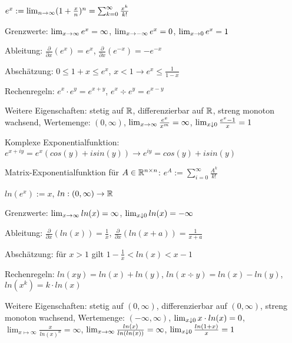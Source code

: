 \begin{definition}[Exponentialfunktion]
	$e^x := \lim_{n \rightarrow \infty} (1 + \frac{x}{n})^n = \sum_{k=0}^{\infty} \frac{x^k}{k!}$
	\begin{description} [noitemsep]
		\item Grenzwerte: $\lim_{x \rightarrow \infty} e^x = \infty$, $\lim_{x \rightarrow -\infty} e^x = 0$, $\lim_{x \rightarrow 0} e^x = 1$
		\item Ableitung: $\frac{\partial}{\partial x}(e^x) = e^x$, $\frac{\partial}{\partial x}(e^{-x}) = -e^{-x}$		
		\item Abschätzung: $ 0 \leq 1 + x \leq e^x$,  $x < 1 \rightarrow e^x \leq \frac{1}{1 - x}$ 
		\item Rechenregeln: $e^x \cdot e^y = e^{x+y}$, $e^x \div e^y = e^{x-y}$
		\item Weitere Eigenschaften: stetig auf $\mathbb{R}$, differenzierbar auf $\mathbb{R}$, streng monoton wachsend, Wertemenge: $(0, \infty)$, $\lim_{x \rightarrow \infty} \frac{e^x}{x^m} = \infty$, $\lim_{x \downarrow 0} \frac{e^x - 1}{x} = 1$
		\item Komplexe Exponentialfunktion: $e^{x+iy} = e^x(cos(y) + i sin(y)) \rightarrow e^{iy} = cos(y) + i sin(y)$
		\item Matrix-Exponentialfunktion für $A \in \mathbb{R}^{n \times n}$: $e^A := \sum_{i = 0}^\infty \frac{A^k}{k!}$
	\end{description}
\end{definition}

\begin{definition}[Logarithmusfunktion]
	$ln(e^x) := x$, $ln : (0, \infty) \rightarrow \mathbb{R}$
	
	\begin{description} [noitemsep]
		\item Grenzwerte: $\lim_{x \rightarrow \infty} ln (x) = \infty$, $\lim_{x \downarrow 0} ln (x )= - \infty$
		\item Ableitung: $\frac{\partial}{\partial x} (ln(x)) = \frac{1}{x}$, $\frac{\partial}{\partial x} (ln(x + a)) = \frac{1}{x + a}$
		\item Abschätzung: für $x > 1$ gilt $1 - \frac{1}{x} < ln(x) < x - 1$
		\item Rechenregeln: $ln(xy) = ln(x) + ln(y)$, $ln(x \div y) = ln(x) - ln(y)$, $ln(x^k) = k \cdot ln(x)$
		\item Weitere Eigenschaften: stetig auf $(0,\infty)$, differenzierbar auf $(0,\infty)$, streng monoton wachsend, Wertemenge: $(- \infty, \infty)$, $\lim_{x \downarrow 0} x \cdot ln(x) = 0$, $\lim_{x \mapsto \infty} \frac{x}{ln(x)^n} = \infty$,  $\lim_{x \rightarrow \infty} \frac{ln(x)}{ln(ln(x))} = \infty$,  $\lim_{x \downarrow 0} \frac{ln(1+x)}{x} = 1$
	\end{description}
\end{definition}

